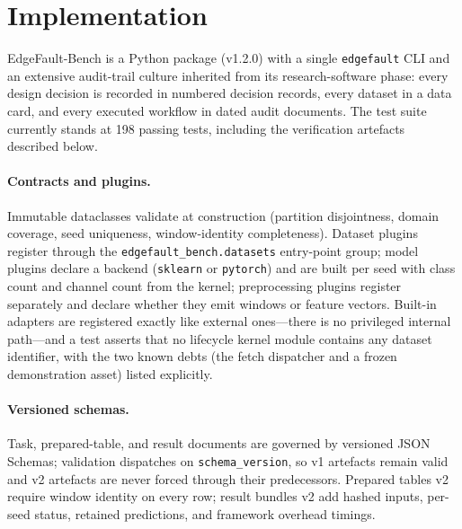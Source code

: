 \section{Implementation}
\label{sec:impl}

EdgeFault-Bench is a Python package (v1.2.0) with a single \texttt{edgefault}
CLI and an extensive audit-trail culture inherited from its research-software
phase: every design decision is recorded in numbered decision records, every
dataset in a data card, and every executed workflow in dated audit documents.
The test suite currently stands at 198 passing tests, including the
verification artefacts described below.

\paragraph{Contracts and plugins.}
Immutable dataclasses validate at construction (partition disjointness,
domain coverage, seed uniqueness, window-identity completeness). Dataset
plugins register through the \texttt{edgefault\_bench.datasets} entry-point
group; model plugins declare a backend (\texttt{sklearn} or
\texttt{pytorch}) and are built per seed with class count and channel count
from the kernel; preprocessing plugins register separately and declare
whether they emit windows or feature vectors. Built-in adapters are
registered exactly like external ones---there is no privileged internal
path---and a test asserts that no lifecycle kernel module contains any
dataset identifier, with the two known debts (the fetch dispatcher and a
frozen demonstration asset) listed explicitly.

\paragraph{Versioned schemas.}
Task, prepared-table, and result documents are governed by versioned JSON
Schemas; validation dispatches on \texttt{schema\_version}, so v1 artefacts
remain valid and v2 artefacts are never forced through their predecessors.
Prepared tables v2 require window identity on every row; result bundles v2
add hashed inputs, per-seed status, retained predictions, and framework
overhead timings.

